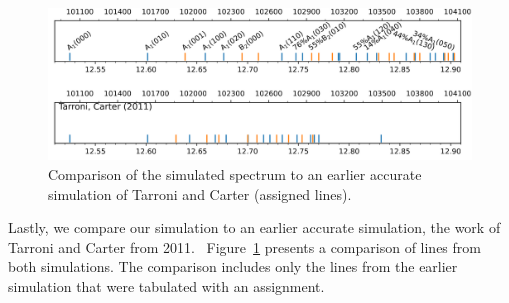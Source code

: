 \documentclass[
12pt,
a4paper,
prb,
superscriptaddress,
tightenlines,  %
]{revtex4}
\begin{document}
\begin{figure}
    \includegraphics[width=16 cm]{figures/sim_vs_TarroniCarter}
    \caption{
        Comparison of the simulated spectrum to an earlier accurate simulation
        of Tarroni and Carter (assigned lines).~\cite{tarroni:O3:2011}
    }
    \label{fig:sim_vs_tarronicarter}
\end{figure}

Lastly, we compare our simulation to an earlier accurate simulation, the work
of Tarroni and Carter from 2011.~\cite{tarroni:O3:2011}
Figure~\ref{fig:sim_vs_tarronicarter} presents a comparison of lines from both
simulations. The comparison includes only the lines from the earlier
simulation that were tabulated with an assignment. 
\end{document}
